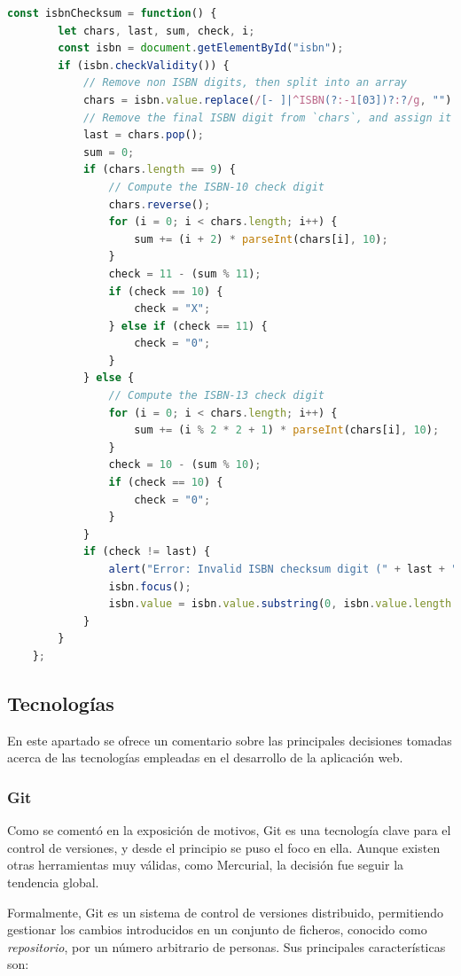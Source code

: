 \documentclass[a4paper]{article}
\begin{document}
    \begin{lstlisting}[language=JavaScript,caption=Validación del dígito de control del ISBN en cliente,label=list:js_isbn]
    const isbnChecksum = function() {
    	let chars, last, sum, check, i;
    	const isbn = document.getElementById("isbn");
    	if (isbn.checkValidity()) {
    		// Remove non ISBN digits, then split into an array
    		chars = isbn.value.replace(/[- ]|^ISBN(?:-1[03])?:?/g, "").split("");
    		// Remove the final ISBN digit from `chars`, and assign it to `last`
    		last = chars.pop();
    		sum = 0;
    		if (chars.length == 9) {
    			// Compute the ISBN-10 check digit
    			chars.reverse();
    			for (i = 0; i < chars.length; i++) {
    				sum += (i + 2) * parseInt(chars[i], 10);
    			}
    			check = 11 - (sum % 11);
    			if (check == 10) {
    				check = "X";
    			} else if (check == 11) {
    				check = "0";
    			}
    		} else {
    			// Compute the ISBN-13 check digit
    			for (i = 0; i < chars.length; i++) {
    				sum += (i % 2 * 2 + 1) * parseInt(chars[i], 10);
    			}
    			check = 10 - (sum % 10);
    			if (check == 10) {
    				check = "0";
    			}
    		}
    		if (check != last) {
    			alert("Error: Invalid ISBN checksum digit (" + last + "). Try with (" + check + ")");
    			isbn.focus();
    			isbn.value = isbn.value.substring(0, isbn.value.length - 1);
    		}
    	}
    };
    \end{lstlisting}
    
    
    \subsection{Tecnologías}
    En este apartado se ofrece un comentario sobre las principales decisiones tomadas acerca de las tecnologías empleadas en el desarrollo de la aplicación web.

	\subsubsection{Git}
	Como se comentó en la exposición de motivos, Git es una tecnología clave para el control de versiones, y desde el principio se puso el foco en ella. Aunque existen otras herramientas muy válidas, como Mercurial, la decisión fue seguir la tendencia global.
	
	Formalmente, Git es un sistema de control de versiones distribuido, permitiendo gestionar los cambios introducidos en un conjunto de ficheros, conocido como \emph{repositorio}, por un número arbitrario de personas. Sus principales características son:
	
\end{document}
